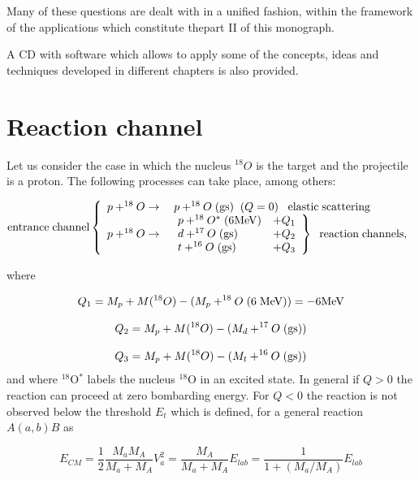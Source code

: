 Many of these questions are dealt with in a unified fashion, within the framework of the applications which constitute thepart II of this monograph.


A CD with software which allows to apply some of the concepts, ideas and techniques developed in different chapters is also provided.


\section{Reaction channel}

Let us consider the case in which the nucleus $^{18}O$ is the target and the projectile is a proton. The following processes can take place, among others:

\begin{equation}
{\rm entrance\;channel} \left\{
\begin{array}{rl}
p+^{18}O \rightarrow & \;p + ^{18}O \;({\rm gs})\;\; (Q=0) \;\;\; {\rm elastic\; scattering} \\
p+^{18}O \rightarrow & \left. \begin{array}{ll}
     p + ^{18}O^* \;({\rm 6 MeV}) & + Q_1 \\
     d + ^{17}O \;({\rm gs})    & + Q_2 \\
     t + ^{16}O \;({\rm gs})    & + Q_3
		 \end{array} \right\} \;\; {\rm reaction\;channels,}
\end{array}
\right.
\end{equation}

\noindent where

\begin{equation}
Q_1 = M_p + M(^{18}O) - (M_p + ^{18}O \; (6 \;{\rm MeV})) = -6 {\rm MeV}
\end{equation}

\begin{equation}
Q_2 = M_p + M(^{18}O) - (M_d + ^{17}O \; ({\rm gs}))
\end{equation}

\begin{equation}
Q_3 = M_p + M(^{18}O) - (M_t + ^{16}O \; ({\rm gs}))
\end{equation}
and where $^{18}$O$^*$ labels the nucleus $^{18}$O in an excited state. In general if $Q>0$ the reaction can proceed at zero bombarding energy. For $Q<0$ the reaction is not observed below the threshold $E_t$ which is defined, for a general reaction $A(a,b)B$ as

\begin{equation}
E_{CM} = \frac{1}{2} \frac{M_a M_A}{M_a + M_A} V_a^2 = \frac{M_A}{M_a + M_A} E_{lab} = \frac{1}{1+(M_a/M_A)} E_{lab}
\end{equation}

